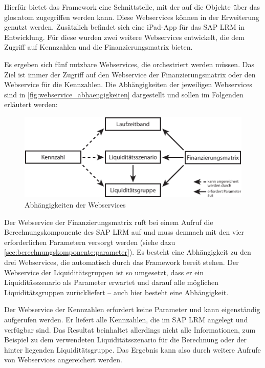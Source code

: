 \begin{onehalfspacing}
Hierfür bietet das Framework eine Schnittstelle, mit der auf die Objekte über das \gls{glos:atom} zugegriffen werden kann. Diese Webservices können in der Erweiterung genutzt werden. Zusätzlich befindet sich eine iPad-App für das SAP LRM in Entwicklung. Für diese wurden zwei weitere Webservices entwickelt, die dem Zugriff auf Kennzahlen und die Finanzierungsmatrix bieten.

Es ergeben sich fünf nutzbare Webservices, die orchestriert werden müssen. Das Ziel ist immer der Zugriff auf den Webservice der Finanzierungsmatrix oder den Webservice für die Kennzahlen. Die Abhängigkeiten der jeweiligen Webservices sind in \vref{fig:webservice_abhaengigkeiten} dargestellt und sollen im Folgenden erläutert werden:

\begin{figure}[!ht]
\centering
\setlength{\unitlength}{1mm}
\includegraphics[width=15cm]{images/Abbildung14-Abhaengigkeiten-Webservices.pdf}
\caption{Abhängigkeiten der Webservices\label{fig:webservice_abhaengigkeiten}}
\end{figure}


Der Webservice der Finanzierungsmatrix ruft bei einem Aufruf die Berechnungskomponente des SAP LRM auf und muss demnach mit den vier erforderlichen Parametern versorgt werden (siehe dazu \vref{sec:berechnungskomponente:parameter}). Es besteht eine Abhängigkeit zu den drei Webservices, die automatisch durch das Framework  bereit stehen. Der Webservice der Liquiditätsgruppen ist so umgesetzt, dass er ein Liquiditässzenario als Parameter erwartet und darauf alle möglichen Liquiditätsgruppen zurückliefert -- auch hier besteht eine Abhängigkeit.

Der Webservice der Kennzahlen erfordert keine Parameter und kann eigenständig aufgerufen werden. Er liefert alle Kennzahlen, die im SAP LRM angelegt und verfügbar sind. Das Resultat beinhaltet allerdings nicht alle Informationen, zum Beispiel zu dem verwendeten Liquiditätsszenario für die Berechnung oder der hinter liegenden Liquiditätsgruppe. Das Ergebnis kann also durch weitere Aufrufe von Webservices angereichert werden.


\end{onehalfspacing}
